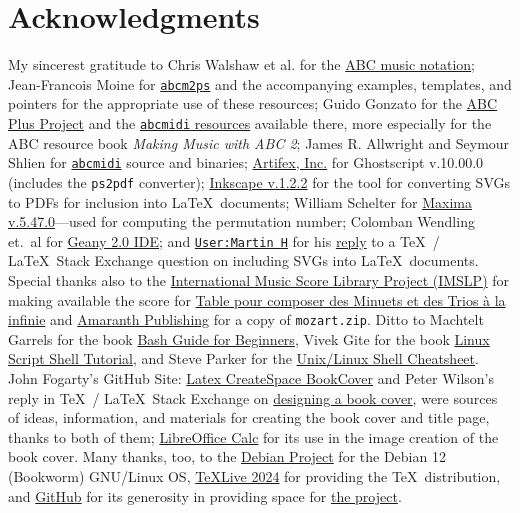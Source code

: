 \documentclass[a4paper,x11names,svgnames,10pt]{article}
\begin{document}
{\section{Acknowledgments}
My sincerest gratitude to Chris Walshaw et al. for the \href{http://www.abcnotation.com/}{ABC music notation}; Jean-Francois Moine for \href{http://moinejf.free.fr/}{\tt abcm2ps} and the accompanying examples, templates, and pointers for the appropriate use of these resources; Guido Gonzato for the \href{http://abcplus.sourceforge.net/}{ABC Plus Project} and the \href{http://abcplus.sourceforge.net/#abcMIDI}{{\tt abcmidi} resources} available there, more especially for the ABC resource book {\em Making Music with ABC 2}; James R. Allwright and Seymour Shlien for \href{http://abc.sourceforge.net/abcMIDI}{\tt abcmidi} source and binaries; \href{https://artifex.com/}{Artifex, Inc.} for Ghostscript v.10.00.0 (includes the {\tt ps2pdf} converter); \href{https://www.inkscape.org/}{Inkscape v.1.2.2} for the tool for converting SVGs to PDFs for inclusion into \LaTeX\ documents; William Schelter for \href{https://maxima.sourceforge.io}{Maxima v.5.47.0}---used for computing the permutation number; Colomban Wendling et.\ al for \href{https://www.geany.org}{Geany 2.0 IDE}; and \href{https://tex.stackexchange.com/users/632/martin-h}{\tt User:Martin H} for his \href{https://tex.stackexchange.com/questions/2099/how-to-include-svg-diagrams-in-latex}{reply} to a \TeX\ / \LaTeX\ Stack Exchange question on including SVGs into \LaTeX\ documents. Special thanks also to the \href{http://imslp.org/}{International Music Score Library Project (IMSLP)} for making available the score for \href{http://imslp.org/wiki/Table\_pour\_composer\_des\_Minuets\_et\_des\_Trios\_\%C3\%A0\_la\_infinie\_(Stadler,_Maximilian)}{
Table pour composer des Minuets et des Trios à la infinie} and \href{https://www.amaranthpublishing.com/MozartDiceGame.htm}{Amaranth Publishing} for a copy of {\tt mozart.zip}. Ditto to Machtelt Garrels for the book \href{http://tldp.org/LDP/Bash-Beginners-Guide/html/Bash-Beginners-Guide.html}{Bash Guide for Beginners}, Vivek Gite for the book \href{http://www.freeos.com/guides/lsst/}{Linux Script Shell Tutorial}, and Steve Parker for the \href{http://steve-parker.org/sh/cheatsheet.pdf}{Unix/Linux Shell Cheatsheet}. John Fogarty's GitHub Site: \href{https://github.com/jfogarty/latex-createspace-bookcover}{Latex CreateSpace BookCover} and Peter Wilson's reply in \TeX\ / \LaTeX\ Stack Exchange on \href{https://tex.stackexchange.com/questions/17579/how-can-i-design-a-book-cover}{designing a book cover}, were sources of ideas, information, and materials for creating the book cover and title page, thanks to both of them; \href{http://www.libreoffice.org/}{LibreOffice Calc} for its use in the image creation of the book cover.  Many thanks, too, to the \href{https://www.debian.org}{Debian Project} for the Debian 12 (Bookworm) GNU/Linux OS, \href{http://www.tug.org/texlive/}{TeXLive 2024} for providing the \TeX\ distribution,  and \href{https://github.com}{GitHub} for its generosity in providing space for \href{https://github.com/justineuro/mdgBookSVG4Kit}{the project}.  

}
\end{document}

